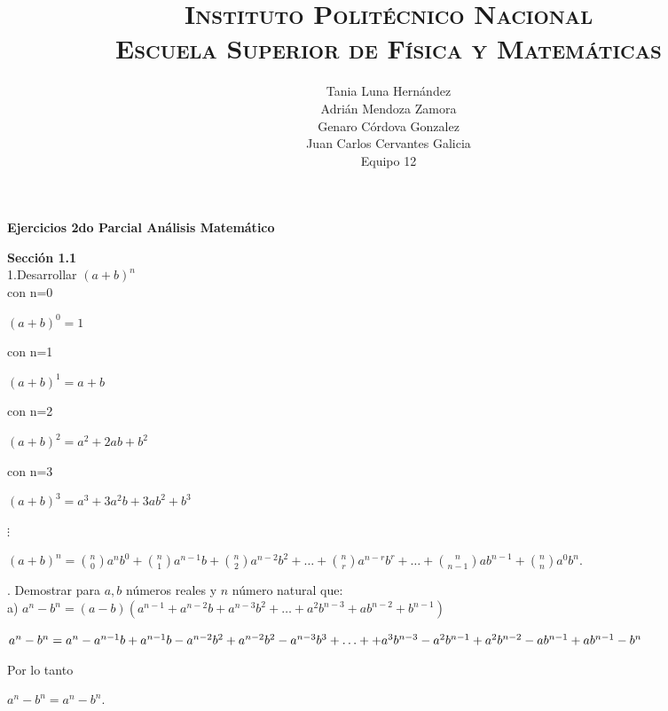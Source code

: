 \documentclass[12pt,a4paper,scrartcl]{article}
\title{	
\normalfont \normalsize 
\textsc{Instituto Polit\'ecnico Nacional\\
Escuela Superior de F\'isica y Matem\'aticas} \\
}
\author{
Tania Luna Hern\'andez\\
Adri\'an Mendoza Zamora\\
Genaro C\'ordova Gonzalez\\
Juan Carlos Cervantes Galicia\\
Equipo 12}
\begin{document}
\maketitle

{\textbf{{Ejercicios 2do Parcial  An\'alisis Matem\'atico }}

\textbf{Secci\'on 1.1}\\

1.Desarrollar $(a+b)^n$\\

con n=0\\
\begin{center}
$(a+b)^0=1$
\end{center}

con n=1\\
\begin{center}
$(a+b)^1=a+b$
\end{center}

con n=2\\
\begin{center}
$(a+b)^2=a^2+2ab+b^2$
\end{center}

con n=3\\
\begin{center}
$(a+b)^3=a^3+3a^2b+3ab^2+b^3$
\end{center}

\begin{center}
$\vdots$
\end{center}

\begin{center}
$(a+b)^n=\binom{n}{0}a^nb^0+\binom{n}{1}a^{n-1}b+\binom{n}{2}a^{n-2}b^2+\dots+\binom{n}{r}a^{n-r}b^r+\dots+\binom{n}{n-1}ab^{n-1}+\binom{n}{n}a^0b^n$.
\end{center}





. Demostrar para $a,b$ n\'umeros reales y $n$ n\'umero natural que:\\

a) 
$a^n-b^n = (a-b)(a^{n-1}+a^{n-2}b+a^{n-3}b^2+ \hdots +a^{2}b^{n-3}+ab^{n-2}+b^{n-1}) $\\
\begin{center}
$a^n-b^n=a^n-a^{n-1}b+a^{n-1}b-a^{n-2}b^2+a^{n-2}b^2-a^{n-3}b^3+\ldots+\linebreak+a^3b^{n-3}-a^{2}b^{n-1}+a^2b^{n-2}-ab^{n-1}+ab^{n-1}-b^n$
\end{center}
Por lo tanto \\
\begin{center}
$a^n-b^n=a^n-b^n$.
\end{center}
\vspace{5em}

}
\end{document}
